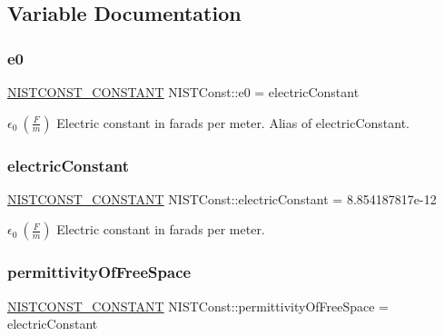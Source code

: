 \subsection{Variable Documentation}
\mbox{\label{group___n_i_s_t_const-_electric_constant_gaaf12fb4810ef85727ab37bd612df8393}} 
\subsubsection{\texorpdfstring{e0}{e0}}
{\footnotesize\ttfamily \mbox{\hyperlink{group___n_i_s_t_const-_macros_ga2b0fc1d7452373f816175dd86ce26729}{N\+I\+S\+T\+C\+O\+N\+S\+T\+\_\+\+C\+O\+N\+S\+T\+A\+NT}} N\+I\+S\+T\+Const\+::e0 = electric\+Constant}

$\epsilon_0 \ (\frac{F}{m})$ Electric constant in farads per meter. Alias of electric\+Constant. \mbox{\label{group___n_i_s_t_const-_electric_constant_ga8c31e3e43f4ddbc5e9d499a58a8b9de1}} 
\subsubsection{\texorpdfstring{electric\+Constant}{electricConstant}}
{\footnotesize\ttfamily \mbox{\hyperlink{group___n_i_s_t_const-_macros_ga2b0fc1d7452373f816175dd86ce26729}{N\+I\+S\+T\+C\+O\+N\+S\+T\+\_\+\+C\+O\+N\+S\+T\+A\+NT}} N\+I\+S\+T\+Const\+::electric\+Constant = 8.\+854187817e-\/12}

$\epsilon_0 \ (\frac{F}{m})$ Electric constant in farads per meter. \mbox{\label{group___n_i_s_t_const-_electric_constant_gad36040fb61c99a24582827957b2f37bf}} 
\subsubsection{\texorpdfstring{permittivity\+Of\+Free\+Space}{permittivityOfFreeSpace}}
{\footnotesize\ttfamily \mbox{\hyperlink{group___n_i_s_t_const-_macros_ga2b0fc1d7452373f816175dd86ce26729}{N\+I\+S\+T\+C\+O\+N\+S\+T\+\_\+\+C\+O\+N\+S\+T\+A\+NT}} N\+I\+S\+T\+Const\+::permittivity\+Of\+Free\+Space = electric\+Constant}

